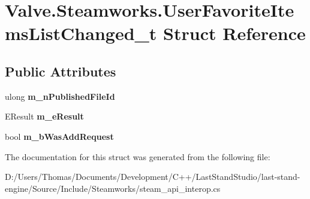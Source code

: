 \hypertarget{structValve_1_1Steamworks_1_1UserFavoriteItemsListChanged__t}{}\section{Valve.\+Steamworks.\+User\+Favorite\+Items\+List\+Changed\+\_\+t Struct Reference}
\label{structValve_1_1Steamworks_1_1UserFavoriteItemsListChanged__t}
\subsection*{Public Attributes}
\begin{DoxyCompactItemize}
\item 
\hypertarget{structValve_1_1Steamworks_1_1UserFavoriteItemsListChanged__t_acf4ba4555968b7202e71d9b763168ab3}{}ulong {\bfseries m\+\_\+n\+Published\+File\+Id}\label{structValve_1_1Steamworks_1_1UserFavoriteItemsListChanged__t_acf4ba4555968b7202e71d9b763168ab3}

\item 
\hypertarget{structValve_1_1Steamworks_1_1UserFavoriteItemsListChanged__t_a680e1cd540ed5e3f86fa1b1484718a02}{}E\+Result {\bfseries m\+\_\+e\+Result}\label{structValve_1_1Steamworks_1_1UserFavoriteItemsListChanged__t_a680e1cd540ed5e3f86fa1b1484718a02}

\item 
\hypertarget{structValve_1_1Steamworks_1_1UserFavoriteItemsListChanged__t_a9b4a2b9a8d40a5759867e2752e6a57e7}{}bool {\bfseries m\+\_\+b\+Was\+Add\+Request}\label{structValve_1_1Steamworks_1_1UserFavoriteItemsListChanged__t_a9b4a2b9a8d40a5759867e2752e6a57e7}

\end{DoxyCompactItemize}


The documentation for this struct was generated from the following file\+:\begin{DoxyCompactItemize}
\item 
D\+:/\+Users/\+Thomas/\+Documents/\+Development/\+C++/\+Last\+Stand\+Studio/last-\/stand-\/engine/\+Source/\+Include/\+Steamworks/steam\+\_\+api\+\_\+interop.\+cs\end{DoxyCompactItemize}
